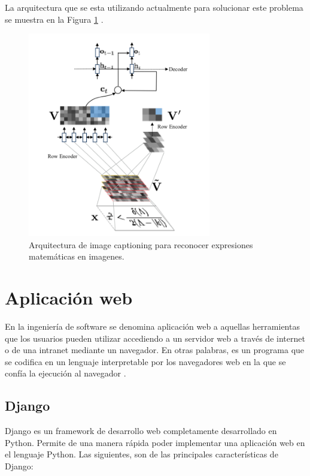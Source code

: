 La arquitectura que se esta utilizando actualmente para solucionar este problema se muestra en la Figura \ref{fig:imgcaptioning} \cite{imagetolatex}\cite{imagemarkup}\cite{chino}.

\begin{figure}
	\centering
	\includegraphics[width=8cm]{capitulo2/images/imgcaptioning}
	\caption{Arquitectura de image captioning para reconocer expresiones matemáticas en imagenes.}
	\label{fig:imgcaptioning}
\end{figure}


\section{Aplicación web}
En la ingeniería de software se denomina aplicación web a aquellas herramientas que los usuarios pueden utilizar accediendo a un servidor web a través de internet o de una intranet mediante un navegador. En otras palabras, es un programa que se codifica en un lenguaje interpretable por los navegadores web en la que se confía la ejecución al navegador \cite{appweb}.

\subsection{Django}
Django es un framework de desarrollo web completamente desarrollado en Python. Permite de una manera rápida poder implementar una aplicación web en el lenguaje Python. Las siguientes, son de las principales características de Django:

